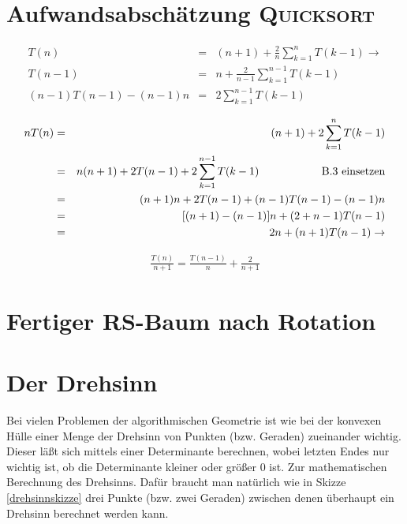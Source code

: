 \documentclass[ngerman,draft,parskip=half*,twoside]{scrreprt}
\theoremstyle{break}
\begin{document}
\section{Aufwandsabschätzung \textsc{Quicksort}}
\label{quicksort}

\begin{align}
T(n) & = & (n+1)+ \frac{2}{n} \sum_{k=1}^nT(k-1) \rightarrow\\
T(n-1) & = & n+\frac{2}{n-1} \sum_{k=1}^{n-1}T(k-1)\\
(n-1)T(n-1) - (n-1)n & = & 2\sum_{k=1}^{n-1}T(k-1)
\end{align}

\begin{align*}
n T(n) & = & (n+1)+ 2 \sum_{k=1}^nT(k-1)\\
& = & n(n+1)+2 T(n-1) +2 \sum_{k=1}^{n-1}T(k-1) \hspace{2cm} \textup{B.3 einsetzen}\\
& = & (n+1)n+2 T(n-1) + (n-1)T(n-1) -(n-1)n\\
& = & [(n+1)-(n-1)]n+(2+n-1) T(n-1)\\
& = & 2n+(n+1)T(n-1) \rightarrow 
\end{align*}

\begin{gather*}
\frac{T(n)}{n+1}= \frac{T(n-1)}{n}+ \frac{2}{n+1}	
\end{gather*}

\section{Fertiger RS-Baum nach Rotation}
\label{rsrotation}
\begin{figure}[H]
\centering


\end{figure}

\section{Der Drehsinn} \label{drehsinn}
Bei vielen Problemen der algorithmischen Geometrie ist wie bei der konvexen Hülle einer Menge der Drehsinn von Punkten (bzw. Geraden) zueinander wichtig.
Dieser läßt sich mittels einer Determinante berechnen, wobei letzten Endes nur wichtig ist, ob die Determinante kleiner oder größer
0 ist. Zur
mathematischen Berechnung des Drehsinns. Dafür braucht man natürlich wie in Skizze
\autoref{drehsinnskizze} drei Punkte (bzw. zwei Geraden) zwischen denen überhaupt ein Drehsinn berechnet werden kann.
\end{document}
